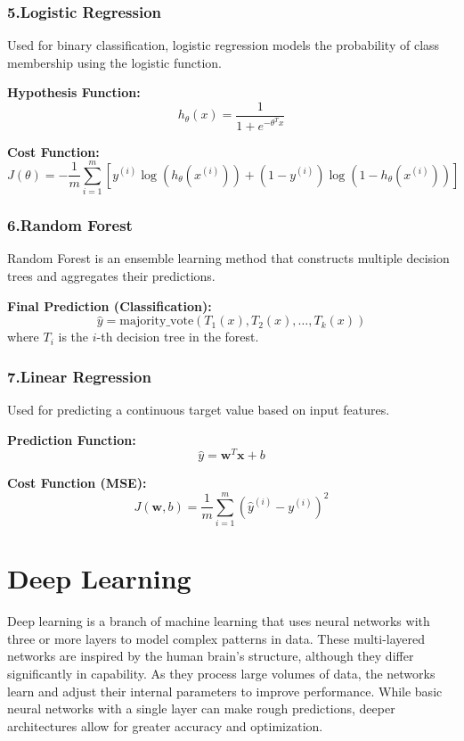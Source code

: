\subsubsection*{5.Logistic Regression}

Used for binary classification, logistic regression models the probability of class membership using the logistic function.

\textbf{Hypothesis Function:}
\[
h_\theta(x) = \frac{1}{1 + e^{-\theta^T x}}
\]

\textbf{Cost Function:}
\[
J(\theta) = -\frac{1}{m} \sum_{i=1}^{m} \left[ y^{(i)} \log(h_\theta(x^{(i)})) + (1 - y^{(i)}) \log(1 - h_\theta(x^{(i)})) \right]
\]

\subsubsection*{6.Random Forest}

Random Forest is an ensemble learning method that constructs multiple decision trees and aggregates their predictions.

\textbf{Final Prediction (Classification):}
\[
\hat{y} = \text{majority\_vote}(T_1(x), T_2(x), \dots, T_k(x))
\]
where \( T_i \) is the \( i \)-th decision tree in the forest.

\subsubsection*{7.Linear Regression}

Used for predicting a continuous target value based on input features.

\textbf{Prediction Function:}
\[
\hat{y} = \mathbf{w}^T \mathbf{x} + b
\]

\textbf{Cost Function (MSE):}
\[
J(\mathbf{w}, b) = \frac{1}{m} \sum_{i=1}^{m} (\hat{y}^{(i)} - y^{(i)})^2
\]

\section{Deep Learning}
Deep learning is a branch of machine learning that uses neural networks with three or more layers to model complex patterns in data. These multi-layered networks are inspired by the human brain’s structure, although they differ significantly in capability. As they process large volumes of data, the networks learn and adjust their internal parameters to improve performance. While basic neural networks with a single layer can make rough predictions, deeper architectures allow for greater accuracy and optimization.

